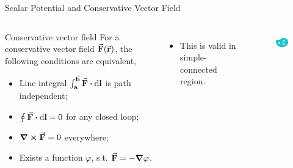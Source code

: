 \documentclass{beamer}
\begin{document}
\begin{frame}{Scalar Potential and Conservative Vector Field}	
    \begin{columns}
        \begin{block}{Conservative vector field}
            For a conservative vector field $\va{F}(\va{r})$, the following conditions are equivalent,
            \begin{itemize}
                \item Line integral $\int_{\vb{a}}^{\va{b}} \va{F} \vdot \dd{\vb{l}}$ is path independent;
                \item $\oint \va{F} \vdot \dd{\vb{l}} = 0$ for any closed loop;
                \item $\curl{\va{F}} = 0$ everywhere;
                \item Exists a function $\varphi$, s.t. $\va{F} = -\grad{\varphi}$.
            \end{itemize}
        \end{block}

        \begin{itemize}
            \item This is valid in simple-connected region.
        \end{itemize}


        \begin{figure}[H]
            \centering
            \includegraphics[height=1cm]{Images/sconnect.png}
        \end{figure}
        \vspace{5.5em}
        
    \end{columns}
\end{frame}
\end{document}
